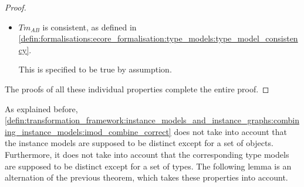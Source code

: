 \begin{proof}
\begin{itemize}
    
    \item $Tm_{AB}$ is consistent, as defined in \cref{defin:formalisations:ecore_formalisation:type_models:type_model_consistency}.
    
    This is specified to be true by assumption.
\end{itemize}

The proofs of all these individual properties complete the entire proof.
\end{proof}

As explained before, \cref{defin:transformation_framework:instance_models_and_instance_graphs:combining_instance_models:imod_combine_correct} does not take into account that the instance models are supposed to be distinct except for a set of objects. Furthermore, it does not take into account that the corresponding type models are supposed to be distinct except for a set of types. The following lemma is an alternation of the previous theorem, which takes these properties into account.

